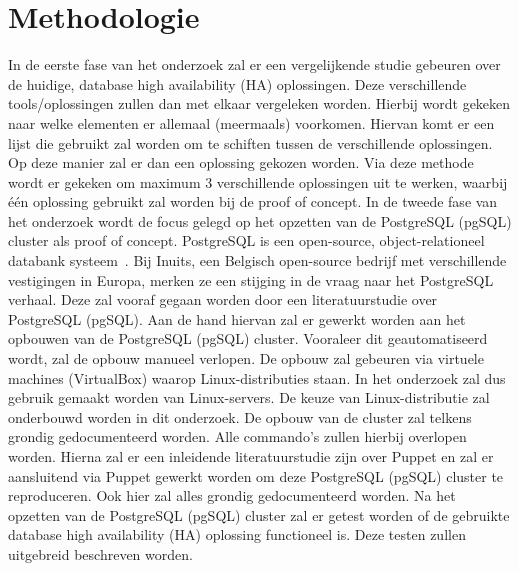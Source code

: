 \section{Methodologie}
\label{sec:methodologie}
In de eerste fase van het onderzoek zal er een vergelijkende studie gebeuren over de huidige, database high availability (HA) oplossingen. Deze verschillende tools/oplossingen zullen dan met elkaar vergeleken worden. Hierbij wordt gekeken naar welke elementen er allemaal (meermaals) voorkomen. Hiervan komt er een lijst die gebruikt zal worden om te schiften tussen de verschillende oplossingen. Op deze manier zal er dan een oplossing gekozen worden. Via deze methode wordt er gekeken om maximum 3 verschillende oplossingen uit te werken, waarbij één oplossing gebruikt zal worden bij de proof of concept.
In de tweede fase van het onderzoek wordt de focus gelegd op het opzetten van de PostgreSQL (pgSQL) cluster als proof of concept. PostgreSQL is een open-source, object-relationeel databank systeem~\autocite{PostgreSQL2020}. Bij Inuits, een Belgisch open-source bedrijf met verschillende vestigingen in Europa, merken ze een stijging in de vraag naar het PostgreSQL verhaal.
Deze zal vooraf gegaan worden door een literatuurstudie over PostgreSQL (pgSQL). Aan de hand hiervan zal er gewerkt worden aan het opbouwen van de PostgreSQL (pgSQL) cluster. Vooraleer dit geautomatiseerd wordt, zal de opbouw manueel verlopen. De opbouw zal gebeuren via virtuele machines (VirtualBox) waarop Linux-distributies staan. In het onderzoek zal dus gebruik gemaakt worden van Linux-servers. De keuze van Linux-distributie zal onderbouwd worden in dit onderzoek. De opbouw van de cluster zal telkens grondig gedocumenteerd worden. Alle commando's zullen hierbij overlopen worden. Hierna zal er een inleidende literatuurstudie zijn over Puppet en zal er aansluitend via Puppet gewerkt worden om deze PostgreSQL (pgSQL) cluster te reproduceren. Ook hier zal alles grondig gedocumenteerd worden.
Na het opzetten van de PostgreSQL (pgSQL) cluster zal er getest worden of de gebruikte database high availability (HA) oplossing functioneel is. Deze testen zullen uitgebreid beschreven worden.




